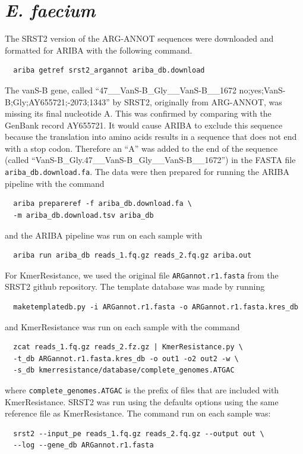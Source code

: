 \documentclass[11pt, a4paper]{article}
\begin{document}
\section{\textit{E. faecium}}
The SRST2 version of the ARG-ANNOT sequences were downloaded and formatted
for ARIBA with the following command.
\begin{verbatim}
  ariba getref srst2_argannot ariba_db.download
\end{verbatim}
The vanS-B gene, called ``47\_\_VanS-B\_Gly\_\_VanS-B\_\_1672
no;yes;VanS-B;Gly;AY655721;-2073;1343'' by SRST2, originally from
ARG-ANNOT, was missing its final nucleotide A. This was confirmed by
comparing with the GenBank record AY655721. It would cause ARIBA to exclude
this sequence because the translation into amino acids results in a sequence
that does not end with a stop codon. Therefore an “A” was added to the end of
the sequence (called ``VanS-B\_Gly.47\_\_VanS-B\_Gly\_\_VanS-B\_\_1672'') in the FASTA
file \texttt{ariba\_db.download.fa}. The data were then prepared for running the ARIBA
pipeline with the command
\begin{verbatim}
  ariba prepareref -f ariba_db.download.fa \
  -m ariba_db.download.tsv ariba_db
\end{verbatim}
and the ARIBA pipeline was run on each sample with
\begin{verbatim}
  ariba run ariba_db reads_1.fq.gz reads_2.fq.gz ariba.out
\end{verbatim}
For KmerResistance, we used the original file \texttt{ARGannot.r1.fasta}
from the
SRST2 github repository. The template database was made by running
\begin{verbatim}
  maketemplatedb.py -i ARGannot.r1.fasta -o ARGannot.r1.fasta.kres_db
\end{verbatim}
and KmerResistance was run on each sample with the command
\begin{verbatim}
  zcat reads_1.fq.gz reads_2.fz.gz | KmerResistance.py \
  -t_db ARGannot.r1.fasta.kres_db -o out1 -o2 out2 -w \
  -s_db kmerresistance/database/complete_genomes.ATGAC
\end{verbatim}
where \texttt{complete\_genomes.ATGAC} is the prefix of files that are included with KmerResistance.
SRST2 was run using the defaults options using the same reference file as
KmerResistance. The command run on each sample was:
\begin{verbatim}
  srst2 --input_pe reads_1.fq.gz reads_2.fq.gz --output out \
  --log --gene_db ARGannot.r1.fasta
\end{verbatim}
\end{document}
